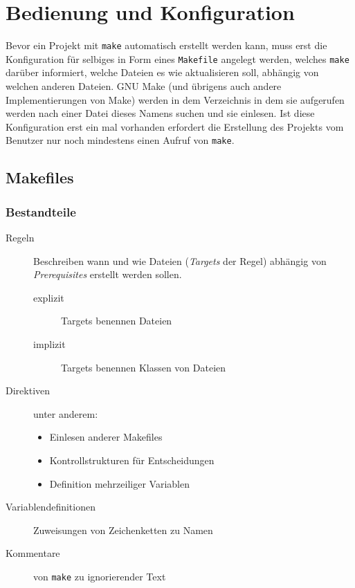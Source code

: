 \section{Bedienung und Konfiguration}

Bevor ein Projekt mit \texttt{make} automatisch erstellt werden kann, muss erst
die Konfiguration für selbiges in Form eines \texttt{Makefile} angelegt werden,
welches \texttt{make} darüber informiert, welche Dateien es wie aktualisieren
soll, abhängig von welchen anderen Dateien. GNU Make (und übrigens auch andere
Implementierungen von Make) werden in dem Verzeichnis in dem sie aufgerufen
werden nach einer Datei dieses Namens suchen und sie einlesen.
%
Ist diese Konfiguration erst ein mal vorhanden erfordert die Erstellung des
Projekts vom Benutzer nur noch mindestens einen Aufruf von \texttt{make}.

\subsection{Makefiles}

\subsubsection{Bestandteile}

\begin{description}
%
	\item[Regeln] Beschreiben wann und wie Dateien (\emph{Targets} der Regel)
	abhängig von \emph{Prerequisites} erstellt werden sollen.
	\begin{description}
		\item[explizit] Targets benennen Dateien
		\item[implizit] Targets benennen Klassen von Dateien
	\end{description}
%
	\item[Direktiven] unter anderem:
	\begin{itemize}
		\item Einlesen anderer Makefiles
		\item Kontrollstrukturen für Entscheidungen
		\item Definition mehrzeiliger Variablen
	\end{itemize}
%
	\item[Variablendefinitionen] Zuweisungen von Zeichenketten zu Namen
%
	\item[Kommentare] von \texttt{make} zu ignorierender Text
\end{description}

